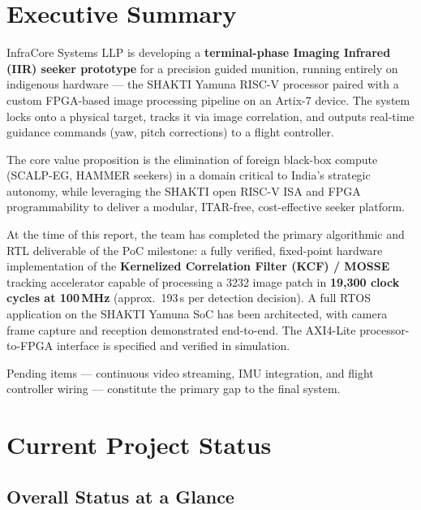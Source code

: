 \documentclass[12pt,a4paper]{article}
\begin{document}
\newpage
\tableofcontents
\newpage

\section{Executive Summary}

InfraCore Systems LLP is developing a \textbf{terminal-phase Imaging Infrared (IIR) seeker prototype} for a precision guided munition, running entirely on indigenous hardware --- the SHAKTI Yamuna RISC-V processor paired with a custom FPGA-based image processing pipeline on an Artix-7 device. The system locks onto a physical target, tracks it via image correlation, and outputs real-time guidance commands (yaw, pitch corrections) to a flight controller.

The core value proposition is the elimination of foreign black-box compute (SCALP-EG, HAMMER seekers) in a domain critical to India's strategic autonomy, while leveraging the SHAKTI open RISC-V ISA and FPGA programmability to deliver a modular, ITAR-free, cost-effective seeker platform.

\medskip
At the time of this report, the team has completed the primary algorithmic and RTL deliverable of the PoC milestone: a fully verified, fixed-point hardware implementation of the \textbf{Kernelized Correlation Filter (KCF) / MOSSE} tracking accelerator capable of processing a 32\texttimes{}32 image patch in \textbf{19,300 clock cycles at 100\,MHz} (approx.\ 193\,\textmu{}s per detection decision). A full RTOS application on the SHAKTI Yamuna SoC has been architected, with camera frame capture and reception demonstrated end-to-end. The AXI4-Lite processor-to-FPGA interface is specified and verified in simulation.

Pending items --- continuous video streaming, IMU integration, and flight controller wiring --- constitute the primary gap to the final system.

\section{Current Project Status}

\subsection{Overall Status at a Glance}
\end{document}
